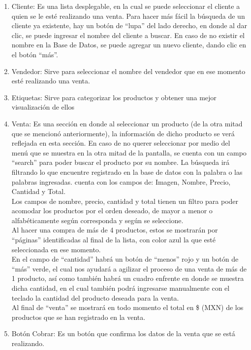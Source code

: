 \documentclass[a4paper,DIV=12]{scrreprt}
\begin{document}
\begin{enumerate}
	\item{Cliente: Es una lista desplegable, en la cual se puede seleccionar el cliente a quien se le esté realizando una venta. Para hacer más fácil la búsqueda de un cliente ya existente, hay un botón de “lupa” del lado derecho, en donde al dar clic, se puede ingresar el nombre del cliente a buscar. En caso de no existir el nombre en la Base de Datos, se puede agregar un nuevo cliente, dando clic en el botón “más”.\\}
	
    \item{Vendedor: Sirve para seleccionar el nombre del vendedor que en ese momento esté realizando una venta.\\ }
    \item{Etiquetas: Sirve para categorizar los productos y obtener una mejor visualización de ellos \\}
    \item{Venta: Es una sección en donde al seleccionar un producto (de la otra mitad que se mencionó anteriormente), la información de dicho producto se verá reflejada en esta sección. En caso de no querer seleccionar por medio del menú que se muestra en la otra mitad de la pantalla, se cuenta con un campo “search” para poder buscar el producto por su nombre. La búsqueda irá filtrando lo que encuentre registrado en la base de datos con la palabra o las palabras ingresadas. cuenta con los campos de: Imagen, Nombre, Precio, Cantidad y Total.\\
    Los campos de nombre, precio, cantidad y total tienen un filtro para poder acomodar los productos por el orden deseado, de mayor a menor o alfabéticamente según corresponda y según se seleccione. \\
Al hacer una compra de más de 4 productos, estos se mostrarán por “páginas” identificadas al final de la lista, con color azul la que esté seleccionada en ese momento. \\
En el campo de “cantidad” habrá un botón de “menos” rojo y un botón de “más” verde, el cual nos ayudará a agilizar el proceso de una venta de más de 1 producto, así como también habrá un cuadro enfrente en donde se muestra dicha cantidad, en el cual también podrá ingresarse manualmente con el teclado la cantidad del producto deseada para la venta. \\
Al final de “venta” se mostrará en todo momento el total en \$ (MXN) de los productos que se han registrado en la venta. 
\\}
   \item{Botón Cobrar: Es un botón que confirma los datos de la venta que se está realizando. \\}
	
\end{enumerate}
\end{document}
